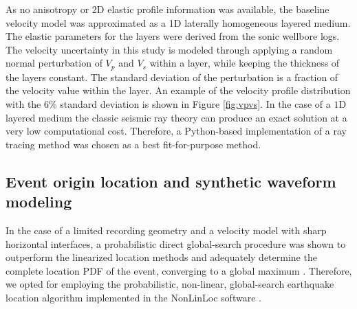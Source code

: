 \documentclass[letterpaper,11pt]{article}
\begin{document}
As no anisotropy or 2D elastic profile information was available, the baseline velocity model was approximated as a 1D laterally homogeneous layered medium. The elastic parameters for the layers were derived from the sonic wellbore logs. The velocity uncertainty in this study is modeled through applying a random normal perturbation of $V_{p}$ and $V_{s}$ within a layer, while keeping the thickness of the layers constant. The standard deviation of the perturbation is a fraction of the velocity value within the layer. An example of the velocity profile distribution with the $6$\% standard deviation is shown in Figure \ref{fig:vpvs}. In the case of a $1$D layered medium the classic seismic ray theory can produce an exact solution at a very low computational cost. Therefore, a Python-based implementation of a ray tracing method was chosen as a best fit-for-purpose method.



\subsection*{Event origin location and synthetic waveform modeling} %
In the case of a limited recording geometry and a velocity model with sharp horizontal interfaces, a probabilistic direct global-search procedure was shown to outperform the linearized location methods and adequately determine the complete location PDF of the event, converging to a global maximum \citep{lomax_earthquake_2009}. Therefore, we opted for employing the probabilistic, non-linear, global-search earthquake location algorithm implemented in the NonLinLoc software \citep{lomax_precise_2001}. 

\end{document}
